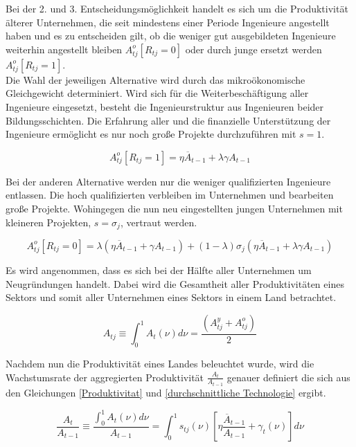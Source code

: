 Bei der 2. und 3. Entscheidungsmöglichkeit handelt es sich um die Produktivität älterer Unternehmen, die seit mindestens einer Periode Ingenieure angestellt haben und es zu entscheiden gilt, ob die weniger gut ausgebildeten Ingenieure weiterhin angestellt bleiben $A_{tj}^{o}[R_{tj}=0]$ oder durch junge ersetzt werden $A_{tj}^{o}[R_{tj}=1]$. \\


Die Wahl der jeweiligen Alternative wird durch das mikroökonomische Gleichgewicht determiniert. Wird sich für die Weiterbeschäftigung aller Ingenieure eingesetzt, besteht die Ingenieurstruktur aus Ingenieuren beider Bildungsschichten. Die Erfahrung aller und die finanzielle Unterstützung der Ingenieure ermöglicht es nur noch gro{\ss}e Projekte durchzuführen mit $s=1$.


	\begin{equation}
		A_{tj}^{o}[R_{tj}=1]=\eta\overline{A}_{t-1}+\lambda\gamma A_{t-1}\label{Produktivitat nur alte}
	\end{equation}


Bei der anderen Alternative werden nur die weniger qualifizierten Ingenieure entlassen. Die hoch qualifizierten verbleiben im Unternehmen und bearbeiten gro{\ss}e Projekte. Wohingegen die nun neu eingestellten jungen Unternehmen mit kleineren Projekten, $s=\sigma_j$, vertraut werden. 


	\begin{equation}
		A_{tj}^o[R_{tj}=0]=\lambda(\eta\overline{A}_{t-1}+\gamma A_{t-1})+(1-\lambda)\sigma_j(\eta\overline{A}_{t-1}+\lambda\gamma A_{t-1})\label{Produktivitat alt und jung}
	\end{equation}


Es wird angenommen, dass es sich bei der Hälfte aller Unternehmen um Neugründungen handelt. Dabei wird die Gesamtheit aller Produktivitäten eines Sektors und somit aller Unternehmen eines Sektors in einem Land betrachtet. 


	\begin{equation}
		A_{tj}\equiv\int_0^1 A_{t}(\nu)d\nu=\frac{(A_{tj}^y+A_{tj}^o)}{2} \label{Produktivitat gesamt}
	\end{equation}


Nachdem nun die Produktivität eines Landes beleuchtet wurde, wird die Wachstumsrate der aggregierten Produktivität $\frac{A_t}{A_{t-1}}$ genauer definiert die sich aus den Gleichungen \eqref{Produktivitat} und \eqref{durchschnittliche Technologie} ergibt.


	\begin{equation}
		\frac{A_t}{A_{t-1}}\equiv\frac{\int_0^1A_{t}(\nu)d\nu}{A_{t-1}}=\int_0^1s_{tj}(\nu)\left[\eta\frac{\overline{A}_{t-1}}{A_{t-1}}+\gamma_t(\nu)\right]d\nu
		\label{WachstumTechnologie}
	\end{equation}


